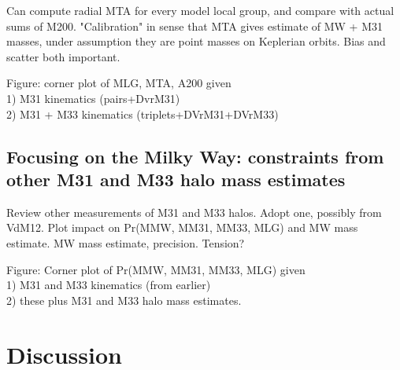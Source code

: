 \documentclass[iop,apj]{emulateapj}
\begin{document}
Can compute radial MTA for every model local group,  and compare with actual
sums of M200. "Calibration" in sense that MTA gives estimate of MW + M31
masses, under assumption they are point masses on Keplerian orbits. Bias and
scatter both important.

Figure: corner plot of MLG, MTA, A200 given \\
  1) M31 kinematics (pairs+DvrM31)\\
  2) M31 + M33 kinematics (triplets+DVrM31+DVrM33)\\


\subsection{Focusing on the Milky Way: constraints from other M31 and M33 halo mass estimates}
\label{sec:results:MW}

Review other measurements of M31 and M33 halos. Adopt one, possibly from
VdM12. Plot impact on Pr(MMW, MM31, MM33, MLG) and MW mass estimate. MW mass
estimate, precision. Tension?

Figure: Corner plot of Pr(MMW, MM31, MM33, MLG) given\\
   1) M31 and M33 kinematics (from earlier) \\
   2) these plus M31 and M33 halo mass estimates. \\


% 


\section{Discussion}
\label{sec:discuss}
\end{document}

